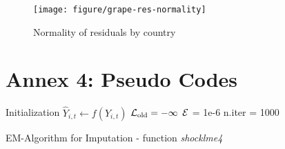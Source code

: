 \documentclass[nojss]{jss}\usepackage[]{graphicx}\usepackage[]{color}
\makeatletter
\def\maxwidth{ %
  \ifdim\Gin@nat@width>\linewidth
    \linewidth
  \else
    \Gin@nat@width
  \fi
}
\newenvironment{knitrout}{}{} %
\makeatother
\begin{document}
\begin{knitrout}
\color{fgcolor}\begin{figure}[!ht]


{\centering \texttt{[image: figure/grape-res-normality]} 

}

\caption[Normality of residuals by country]{Normality of residuals by country\label{fig:grape-res-normality}}
\end{figure}


\end{knitrout}


\FloatBarrier
\section*{Annex 4: Pseudo Codes}

\begin{algorithm}
  \SetAlgoLined
  \BlankLine
  Initialization\;
  \Indp\Indp\Indp 
  $\hat{Y}_{i, t} \leftarrow f(Y_{i, t})$\;
  $\cal{L}_{\text{old}} = -\infty$\;
  $\cal{E}$ = 1e-6\;
  n.iter = 1000\;
  \Indm\Indm\Indm

  
    
    
    \caption{EM-Algorithm for Imputation - function \emph{shocklme4}}
    \label{alg:imputation}
\end{algorithm}
  
      
\end{document}
